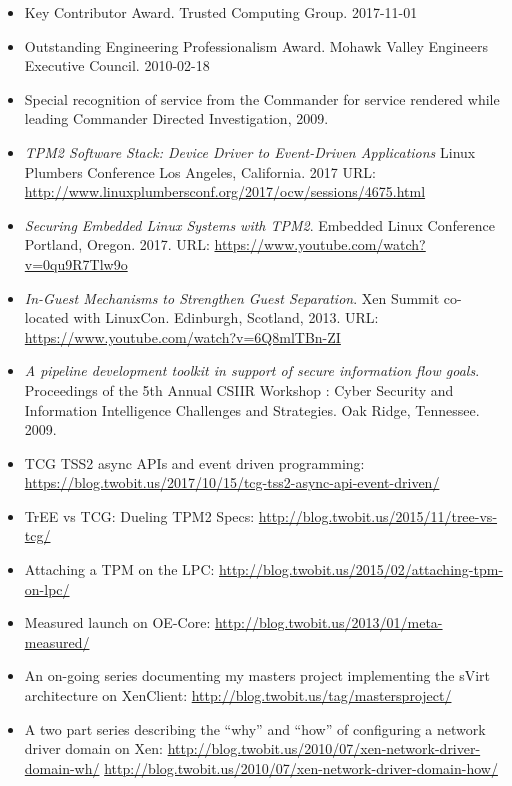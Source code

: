 \documentclass[letterpaper,11pt]{article}
\begin{document}
\begin {itemize}
  \setlength {\itemsep}{1pt}
  \setlength {\parskip}{0pt}
  \setlength {\parsep}{0pt}
  \item Key Contributor Award.
    Trusted Computing Group.
    2017-11-01
  \item Outstanding Engineering Professionalism Award.
    Mohawk Valley Engineers Executive Council.
    2010-02-18
  \item Special recognition of service from the Commander for service
    rendered while leading Commander Directed Investigation, 2009.
\end {itemize}

\begin {itemize}
\item {\it TPM2 Software Stack: Device Driver to Event-Driven Applications}
  Linux Plumbers Conference
  Los Angeles, California.
  2017
  URL: \url {http://www.linuxplumbersconf.org/2017/ocw/sessions/4675.html}
\item {\it Securing Embedded Linux Systems with TPM2}.
  Embedded Linux Conference
  Portland, Oregon.
  2017.
  URL: \url {https://www.youtube.com/watch?v=0qu9R7Tlw9o}
\item {\it In-Guest Mechanisms to Strengthen Guest Separation}.
  Xen Summit co-located with LinuxCon.
  Edinburgh, Scotland,
  2013.
  URL: \url {https://www.youtube.com/watch?v=6Q8mlTBn-ZI}
\item {\it A pipeline development toolkit in support of secure information flow goals}.
  Proceedings of the 5th Annual CSIIR Workshop : Cyber Security and Information Intelligence Challenges and Strategies.
  Oak Ridge, Tennessee.
  2009.
\end{itemize}

\begin {itemize}
  \setlength {\itemsep}{1pt}
  \setlength {\parskip}{0pt}
  \setlength {\parsep}{0pt}
\item TCG TSS2 async APIs and event driven programming:
  \url {https://blog.twobit.us/2017/10/15/tcg-tss2-async-api-event-driven/}
\item TrEE vs TCG: Dueling TPM2 Specs:
  \url {http://blog.twobit.us/2015/11/tree-vs-tcg/}
\item Attaching a TPM on the LPC:
  \url {http://blog.twobit.us/2015/02/attaching-tpm-on-lpc/}
\item Measured launch on OE-Core:
  \url {http://blog.twobit.us/2013/01/meta-measured/}
\item An on-going series documenting my masters project implementing the sVirt architecture on XenClient:
  \url {http://blog.twobit.us/tag/mastersproject/}
\item A two part series describing the ``why'' and ``how'' of configuring a network driver domain on Xen:
  \url {http://blog.twobit.us/2010/07/xen-network-driver-domain-wh/}
  \url {http://blog.twobit.us/2010/07/xen-network-driver-domain-how/}
\end {itemize}
\end{document}
